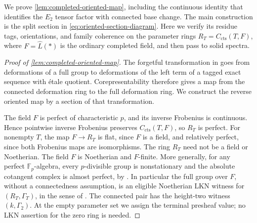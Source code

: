 \documentclass[11pt]{article}
\numberwithin{equation}{section}
\theoremstyle{definition}
\theoremstyle{remark}
\begin{document}
We prove \cref{lem:completed-oriented-map}, including the continuous
identity that identifies the \(E_2\) tensor factor with connected base
change. The main construction is the split section in
\eqref{eq:oriented-section-diagram}. Here we verify its residue tags,
orientations, and family coherence on the parameter rings
\(R_T=C_{\mathrm{cts}}(T,F)\), where \(F=\widehat L(*)\) is the ordinary
completed field, and then pass to solid spectra.

\begin{proof}[Proof of \cref{lem:completed-oriented-map}]
The forgetful transformation in
\cite[Proposition~6.2.2 and Remark~6.2.3]{LurieEllipticII2018} goes from
deformations of a full group to deformations of the left term of a tagged
exact sequence with étale quotient. Corepresentability therefore gives a
map from the connected deformation ring to the full deformation ring.
We construct the reverse oriented map by a section of that transformation.

The field \(F\) is perfect of characteristic \(p\), and its inverse
Frobenius is continuous. Hence pointwise inverse Frobenius preserves
\(C_{\mathrm{cts}}(T,F)\), so \(R_T\) is perfect. For nonempty \(T\), the map
\(F\to R_T\) is flat, since \(F\) is a field, and relatively perfect, since
both Frobenius maps are isomorphisms. The ring \(R_T\) need not be a field
or Noetherian. The field \(F\) is Noetherian and \(F\)-finite.
More generally, for any perfect \(\mathbb F_p\)-algebra, every \(p\)-divisible group is nonstationary
and the absolute cotangent complex is almost perfect, by
\cite[Remark~3.4.2]{LurieEllipticII2018}. In particular the full group
over \(F\), without a connectedness assumption, is an eligible
Noetherian LKN witness for \((R_T,\Gamma_T)\), in the sense of
\cite[Definition~4.3.7 and Example~4.6.4]{BMR2026}. The connected pair has
the height-two witness \((k,\Gamma_2)\). At the empty parameter set we
assign the terminal presheaf value; no LKN assertion for the zero ring is
needed.


\end{proof}
\end{document}
